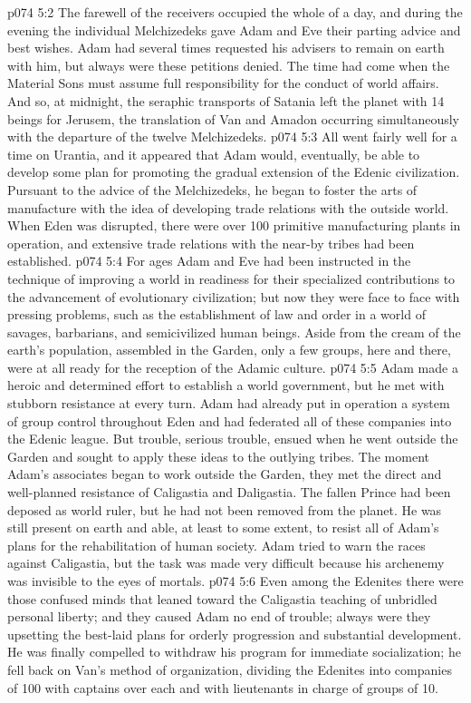 \vs p074 5:2 The farewell of the receivers occupied the whole of a day, and during the evening the individual Melchizedeks gave Adam and Eve their parting advice and best wishes. Adam had several times requested his advisers to remain on earth with him, but always were these petitions denied. The time had come when the Material Sons must assume full responsibility for the conduct of world affairs. And so, at midnight, the seraphic transports of Satania left the planet with 14 beings for Jerusem, the translation of Van and Amadon occurring simultaneously with the departure of the twelve Melchizedeks.
\vs p074 5:3 \pc All went fairly well for a time on Urantia, and it appeared that Adam would, eventually, be able to develop some plan for promoting the gradual extension of the Edenic civilization. Pursuant to the advice of the Melchizedeks, he began to foster the arts of manufacture with the idea of developing trade relations with the outside world. When Eden was disrupted, there were over 100 primitive manufacturing plants in operation, and extensive trade relations with the near-by tribes had been established.
\vs p074 5:4 For ages Adam and Eve had been instructed in the technique of improving a world in readiness for their specialized contributions to the advancement of evolutionary civilization; but now they were face to face with pressing problems, such as the establishment of law and order in a world of savages, barbarians, and semicivilized human beings. Aside from the cream of the earth’s population, assembled in the Garden, only a few groups, here and there, were at all ready for the reception of the Adamic culture.
\vs p074 5:5 Adam made a heroic and determined effort to establish a world government, but he met with stubborn resistance at every turn. Adam had already put in operation a system of group control throughout Eden and had federated all of these companies into the Edenic league. But trouble, serious trouble, ensued when he went outside the Garden and sought to apply these ideas to the outlying tribes. The moment Adam’s associates began to work outside the Garden, they met the direct and well\hyp{}planned resistance of Caligastia and Daligastia. The fallen Prince had been deposed as world ruler, but he had not been removed from the planet. He was still present on earth and able, at least to some extent, to resist all of Adam’s plans for the rehabilitation of human society. Adam tried to warn the races against Caligastia, but the task was made very difficult because his archenemy was invisible to the eyes of mortals.
\vs p074 5:6 Even among the Edenites there were those confused minds that leaned toward the Caligastia teaching of unbridled personal liberty; and they caused Adam no end of trouble; always were they upsetting the best\hyp{}laid plans for orderly progression and substantial development. He was finally compelled to withdraw his program for immediate socialization; he fell back on Van’s method of organization, dividing the Edenites into companies of 100 with captains over each and with lieutenants in charge of groups of 10.
